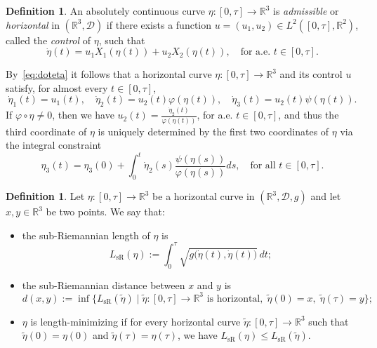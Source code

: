 \documentclass[12pt]{amsart}
\theoremstyle{plain}
\theoremstyle{definition}
\newtheorem{definition}[theorem]{Definition}
\theoremstyle{remark}
\numberwithin{equation}{section}
\newcommand{\R}{\mathbb{R}}
\newcommand{\D}{\mathcal{D}}
\newcommand{\<}{\langle}
\renewcommand{\>}{\rangle}
\newcommand{\0}{\theta}
\newcommand{\1}{{-1}}
\renewcommand{\=}{\coloneqq}
\renewcommand{\.}{\dots}
\renewcommand{\-}{\cdot}
\renewcommand{\:}{\,:\,}
\newcommand{\mr}{\mathrm}
\newcommand{\wt}{\widetilde}
\newcommand{\dsy}{\displaystyle}
\theoremstyle{definition}
\begin{document}
\begin{definition}
An absolutely continuous curve $\eta:[0,\tau]\to\R^3$ is {\em admissible} or {\em horizontal} in $(\R^3,\D)$ if there exists a function $u=(u_1,u_2)\in L^2([0,\tau],\R^2)$, called the {\em control} of $\eta$, such that
\begin{equation}
	\label{eq:doteta}
	\dot\eta(t)=u_1X_1(\eta(t))+u_2X_2(\eta(t)), \quad \text{for a.e. } t\in[0,\tau].
\end{equation} 
\end{definition} 


	By~\eqref{eq:doteta} it follows that a horizontal curve $\eta:[0,\tau]\to\R^3$ and its control $u$ satisfy, for almost every $t\in[0,\tau]$,
	\begin{equation}
		\dot\eta_1(t)=u_1(t), \quad \dot\eta_2(t)=u_2(t)\varphi(\eta(t)), \quad \dot\eta_3(t)=u_2(t)\psi(\eta(t)).
	\end{equation}
	If $\varphi\circ\eta\neq0$, then we have $\dsy u_2(t)=\frac{\dot\eta_2(t)}{\varphi(\eta(t))}$, for a.e. $t\in[0,\tau]$, and thus the third coordinate of $\eta$ is uniquely determined by the first two coordinates of $\eta$ via the integral constraint
	\begin{equation}
		\label{eq:3coord}
		\eta_3(t)=\eta_3(0)+\int_0^t \dot\eta_2(s)\frac{\psi(\eta(s))}{\varphi(\eta(s))}ds, \quad \text{for all $t\in[0,\tau]$}.
	\end{equation}


\begin{definition}
	Let $\eta:[0,\tau]\to\R^3$ be a horizontal curve in $(\R^3,\D,g)$ and let $x,y\in\R^3$ be two points. We say that:
	\begin{itemize}
		\label{def:sRlen}
		\item[(i)] the sub-Riemannian length of $\eta$ is
		\begin{equation}
			\label{eq:deflen}
			L_{\mr{sR}}(\eta):=\int_0^\tau \sqrt{g\big(\dot\eta(t),\dot\eta(t)\big)}\,dt;
		\end{equation}
	
		\item[(ii)] the sub-Riemannian distance between $x$ and $y$ is
		\begin{equation}
			d(x,y):=\inf\{L_{\mr{sR}}(\wt\eta)\mid \wt\eta :[0,\tau]\to\R^3 \text{ is horizontal}, \; \wt\eta(0)=x, \; \wt\eta(\tau)=y\};
		\end{equation}
	
		\item[(iii)] $\eta$ is length-minimizing if for every horizontal curve $\wt\eta:[0,\tau]\to\R^3$ such that $\wt\eta(0)=\eta(0)$ and $\wt\eta(\tau)=\eta(\tau)$, we have $L_{\mr{sR}}(\eta)\leq L_{\mr{sR}}(\wt\eta)$.
	\end{itemize}
\end{definition}
	
\end{document}
